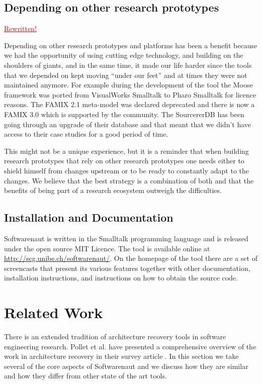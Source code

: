 \documentclass[preprint,12pt]{elsarticle}
\newcommand{\rewritten}{\textcolor{red}{\uline{Rewritten!}}} %
\begin{document}
\subsection {Depending on other research prototypes }
\rewritten

Depending on other research prototypes and platforms has been a benefit because we had the opportunity of using cutting edge technology, and building on the shoulders of giants, and in the same time, it made our life harder since the tools that we depended on kept moving ``under our feet'' and at times they were not maintained anymore. For example during the development of the tool the Moose framework was ported from VisualWorks Smalltalk to Pharo Smalltalk for licence reasons. The FAMIX 2.1 meta-model was declared deprecated and there is now a FAMIX 3.0 which is supported by the community. The SourcererDB has been going through an upgrade of their database and that meant that we didn't have access to their case studies for a good period of time. 

This might not be a unique experience, but it is a reminder that when building research prototypes that rely on other research prototypes one needs either to shield himself from changes upstream or to be ready to constantly adapt to the changes. We believe that the best strategy is a combination of both and that the benefits of being part of a research ecosystem outweigh the difficulties.


\subsection {Installation and Documentation}
Softwarenaut is written in the Smalltalk programming language and is released under the open source MIT Licence. The tool is available online at {\footnotesize \url{http://scg.unibe.ch/softwarenaut/}}. On the homepage of the tool there are a set of screencasts that present its various features together with other documentation, installation instructions, and instructions on how to obtain the source code. 


\newpage
\section {Related Work}
\label {sec:rel}

There is an extended tradition of architecture recovery tools in software engineering research. Pollet et al. have presented a comprehensive overview of the work in architecture recovery in their survey article \cite{pollet-sar}. In this section we take several of the core aspects of Softwarenaut and we discuss how they are similar and how they differ from other state of the art tools.
\end{document}

